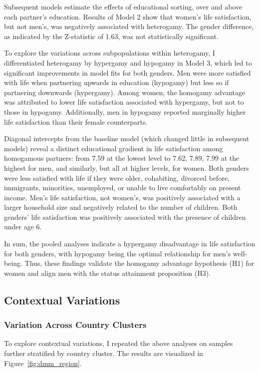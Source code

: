Subsequent models estimate the effects of educational sorting, over and above each partner's education. Results of Model 2 show that women's life satisfaction, but not men's, was negatively associated with heterogamy. The gender difference, as indicated by the Z-statistic of 1.63, was not statistically significant.

To explore the variations across subpopulations within heterogamy, I differentiated heterogamy by hypergamy and hypogamy in Model 3, which led to significant improvements in model fits for both genders. Men were more satisfied with life when partnering upwards in education (hypogamy) but less so if partnering downwards (hypergamy). Among women, the homogamy advantage was attributed to lower life satisfaction associated with hypergamy, but not to those in hypogamy. Additionally, men in hypogamy reported marginally higher life satisfaction than their female counterparts.

Diagonal intercepts from the baseline model (which changed little in subsequent models) reveal a distinct educational gradient in life satisfaction among homogamous partners: from 7.59 at the lowest level to 7.62, 7.89, 7.99 at the highest for men, and similarly, but all at higher levels, for women. Both genders were less satisfied with life if they were older, cohabiting, divorced before, immigrants, minorities, unemployed, or unable to live comfortably on present income. Men's life satisfaction, not women's, was positively associated with a larger household size and negatively related to the number of children. Both genders' life satisfaction was positively associated with the presence of children under age 6.

In sum, the pooled analyses indicate a hypergamy disadvantage in life satisfaction for both genders, with hypogamy being the optimal relationship for men's well-being. Thus, these findings validate the homogamy advantage hypothesis (H1) for women and align men with the status attainment proposition (H3).

\subsection{Contextual Variations}

\subsubsection{Variation Across Country Clusters}

To explore contextual variations, I repeated the above analyses on samples further stratified by country cluster. The results are visualized in Figure~\ref{fig:dmm_region}.

